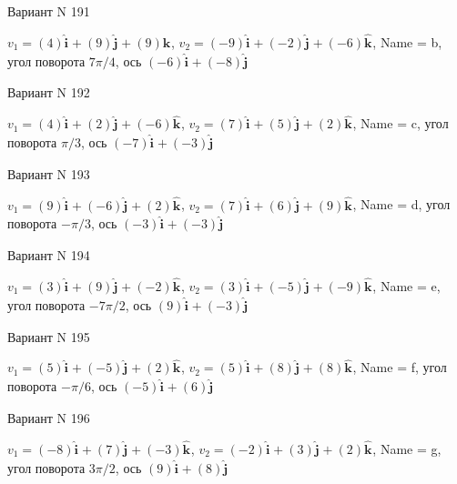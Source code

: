 \documentclass[11pt]{report}
\begin{document}
Вариант N 191

$v_1 = \left(4\right)\mathbf{\hat{i}_{}} + \left(9\right)\mathbf{\hat{j}_{}} + \left(9\right)\mathbf{\hat{k}_{}}$, $v_2 = \left(-9\right)\mathbf{\hat{i}_{}} + \left(-2\right)\mathbf{\hat{j}_{}} + \left(-6\right)\mathbf{\hat{k}_{}}$, Name = b, угол поворота $7 \pi / 4$, ось $\left(-6\right)\mathbf{\hat{i}_{}} + \left(-8\right)\mathbf{\hat{j}_{}}$

Вариант N 192

$v_1 = \left(4\right)\mathbf{\hat{i}_{}} + \left(2\right)\mathbf{\hat{j}_{}} + \left(-6\right)\mathbf{\hat{k}_{}}$, $v_2 = \left(7\right)\mathbf{\hat{i}_{}} + \left(5\right)\mathbf{\hat{j}_{}} + \left(2\right)\mathbf{\hat{k}_{}}$, Name = c, угол поворота $\pi / 3$, ось $\left(-7\right)\mathbf{\hat{i}_{}} + \left(-3\right)\mathbf{\hat{j}_{}}$

Вариант N 193

$v_1 = \left(9\right)\mathbf{\hat{i}_{}} + \left(-6\right)\mathbf{\hat{j}_{}} + \left(2\right)\mathbf{\hat{k}_{}}$, $v_2 = \left(7\right)\mathbf{\hat{i}_{}} + \left(6\right)\mathbf{\hat{j}_{}} + \left(9\right)\mathbf{\hat{k}_{}}$, Name = d, угол поворота $- \pi / 3$, ось $\left(-3\right)\mathbf{\hat{i}_{}} + \left(-3\right)\mathbf{\hat{j}_{}}$

Вариант N 194

$v_1 = \left(3\right)\mathbf{\hat{i}_{}} + \left(9\right)\mathbf{\hat{j}_{}} + \left(-2\right)\mathbf{\hat{k}_{}}$, $v_2 = \left(3\right)\mathbf{\hat{i}_{}} + \left(-5\right)\mathbf{\hat{j}_{}} + \left(-9\right)\mathbf{\hat{k}_{}}$, Name = e, угол поворота $- 7 \pi / 2$, ось $\left(9\right)\mathbf{\hat{i}_{}} + \left(-3\right)\mathbf{\hat{j}_{}}$

Вариант N 195

$v_1 = \left(5\right)\mathbf{\hat{i}_{}} + \left(-5\right)\mathbf{\hat{j}_{}} + \left(2\right)\mathbf{\hat{k}_{}}$, $v_2 = \left(5\right)\mathbf{\hat{i}_{}} + \left(8\right)\mathbf{\hat{j}_{}} + \left(8\right)\mathbf{\hat{k}_{}}$, Name = f, угол поворота $- \pi / 6$, ось $\left(-5\right)\mathbf{\hat{i}_{}} + \left(6\right)\mathbf{\hat{j}_{}}$

Вариант N 196

$v_1 = \left(-8\right)\mathbf{\hat{i}_{}} + \left(7\right)\mathbf{\hat{j}_{}} + \left(-3\right)\mathbf{\hat{k}_{}}$, $v_2 = \left(-2\right)\mathbf{\hat{i}_{}} + \left(3\right)\mathbf{\hat{j}_{}} + \left(2\right)\mathbf{\hat{k}_{}}$, Name = g, угол поворота $3 \pi / 2$, ось $\left(9\right)\mathbf{\hat{i}_{}} + \left(8\right)\mathbf{\hat{j}_{}}$
\end{document}
